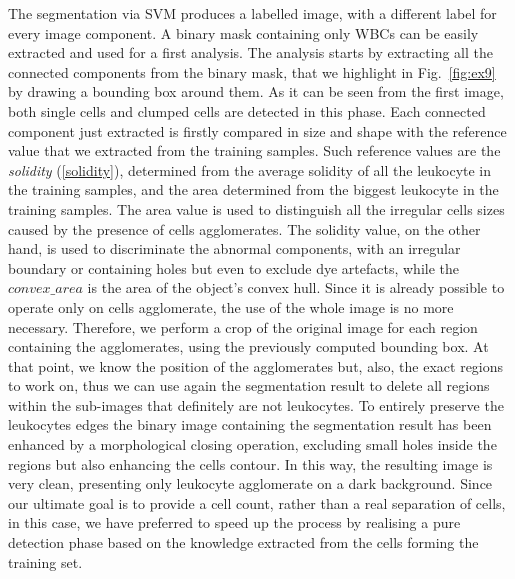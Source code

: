 \documentclass[final,a4paper,12pt,english]{UnicaPhdThesis3}
\begin{document}
The segmentation via SVM produces a labelled image, with a different label for every image component. A binary mask containing only WBCs can be easily extracted and used for a first analysis. The analysis starts by extracting all the connected components from the binary mask, that we highlight in Fig.~\ref{fig:ex9} by drawing a bounding box around them. As it can be seen from the first image, both single cells and clumped cells are detected in this phase.
Each connected component just extracted is firstly compared in size and shape with the reference value that we extracted from the training samples. Such reference values are the \textit{solidity} (\ref{solidity}), determined from the average solidity of all the leukocyte in the training samples, and the area determined from the biggest leukocyte in the training samples. The area value is used to distinguish all the irregular cells sizes caused by the presence of cells agglomerates. The solidity value, on the other hand, is used to discriminate the abnormal components, with an irregular boundary or containing holes but even to exclude dye artefacts, while the $convex\_area$ is the area of the object's convex hull. Since it is already possible to operate only on cells agglomerate, the use of the whole image is no more necessary. Therefore, we perform a crop of the original image for each region containing the agglomerates, using the previously computed bounding box. At that point, we know the position of the agglomerates but, also, the exact regions to work on, thus we can use again the segmentation result to delete all regions within the sub-images that definitely are not leukocytes. 
To entirely preserve the leukocytes edges the binary image containing the segmentation result has been enhanced by a morphological closing operation, excluding small holes inside the regions but also enhancing the cells contour. In this way, the resulting image is very clean, presenting only leukocyte agglomerate on a dark background. Since our ultimate goal is to provide a cell count, rather than a real separation of cells, in this case, we have preferred to speed up the process by realising a pure detection phase based on the knowledge extracted from the cells forming the training set. 
\end{document}
